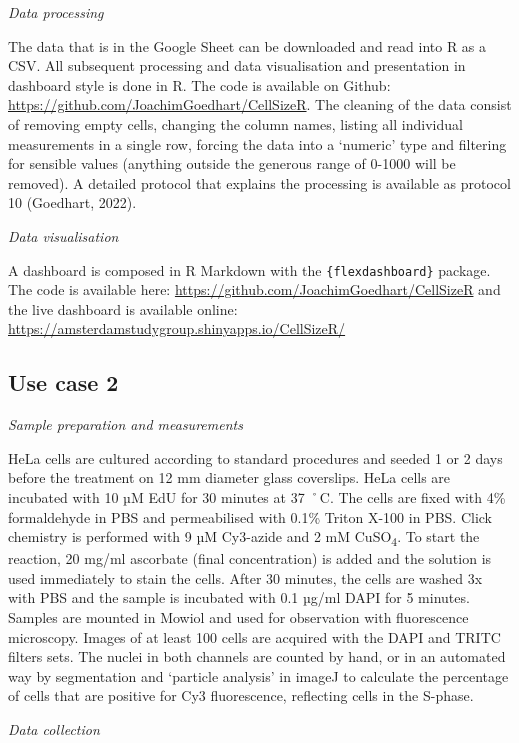 \documentclass[
]{agujournal2019}
\begin{document}
\emph{Data processing}

The data that is in the Google Sheet can be downloaded and read into R
as a CSV. All subsequent processing and data visualisation and
presentation in dashboard style is done in R. The code is available on
Github: \url{https://github.com/JoachimGoedhart/CellSizeR}. The cleaning
of the data consist of removing empty cells, changing the column names,
listing all individual measurements in a single row, forcing the data
into a `numeric' type and filtering for sensible values (anything
outside the generous range of 0-1000 will be removed). A detailed
protocol that explains the processing is available as protocol 10
(Goedhart, 2022).

\emph{Data visualisation}

A dashboard is composed in R Markdown with the
\texttt{\{flexdashboard\}} package. The code is available here:
\url{https://github.com/JoachimGoedhart/CellSizeR} and the live
dashboard is available online:
\url{https://amsterdamstudygroup.shinyapps.io/CellSizeR/}

\hypertarget{use-case-2}{%
\subsection*{Use case 2}\label{use-case-2}}

\emph{Sample preparation and measurements}

HeLa cells are cultured according to standard procedures and seeded 1 or
2 days before the treatment on 12 mm diameter glass coverslips. HeLa
cells are incubated with 10 µM EdU for 30 minutes at 37 ˚C. The cells
are fixed with 4\% formaldehyde in PBS and permeabilised with 0.1\%
Triton X-100 in PBS. Click chemistry is performed with 9 µM Cy3-azide
and 2 mM CuSO\textsubscript{4}. To start the reaction, 20 mg/ml
ascorbate (final concentration) is added and the solution is used
immediately to stain the cells. After 30 minutes, the cells are washed
3x with PBS and the sample is incubated with 0.1 µg/ml DAPI for 5
minutes. Samples are mounted in Mowiol and used for observation with
fluorescence microscopy. Images of at least 100 cells are acquired with
the DAPI and TRITC filters sets. The nuclei in both channels are counted
by hand, or in an automated way by segmentation and `particle analysis'
in imageJ to calculate the percentage of cells that are positive for Cy3
fluorescence, reflecting cells in the S-phase.

\emph{Data collection}
\end{document}
